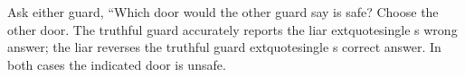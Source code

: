 Ask either guard, ``Which door would the other guard say is safe? Choose the other door. The truthful guard accurately reports the liar	extquotesingle s wrong answer; the liar reverses the truthful guard	extquotesingle s correct answer. In both cases the indicated door is unsafe.

